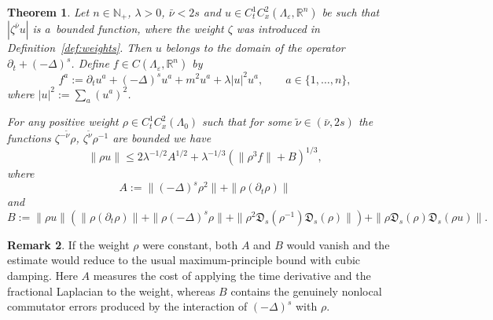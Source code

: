 \documentclass{article}
\numberwithin{equation}{section}
\newcommand{\assign}{:=}
\theoremstyle{plain}
\newtheorem{theorem}{Theorem}[section]
\theoremstyle{definition}
\newtheorem{remark}[theorem]{Remark}
\begin{document}
\begin{theorem}
  \label{thm:partial-coercive-estimates}Let \(n\in\mathbb N_+\), $\lambda > 0$, $\bar{\nu} < 2 s$
  and $u \in C_t^1 C_x^2 (\Lambda_{\varepsilon}, \mathbb{R}^n)$ be such that
  $| \zeta^{\bar{\nu}} u |$ is a~bounded function, where the weight $\zeta$
  was introduced in Definition~\ref{def:weights}. Then $u$ belongs to the domain of
  the operator $\partial_t + (- \Delta)^s$. Define $f \in C 
  (\Lambda_{\varepsilon}, \mathbb{R}^n)$ by
  \begin{equation}
    f^a \assign \partial_t u^a + (- \Delta)^s u^a + m^2 u^a +
    \lambda | u |^2 u^a, \qquad a \in \{ 1, \ldots, n \},
    \label{eq:cubic-fractional}
  \end{equation}
  where $| u |^2  \assign \sum_a (u^a)^2$.
  
  For any positive weight $\rho \in C_t^1 C_x^2
  (\Lambda_{0})$ such that for some $\tilde{\nu} \in
  (\bar{\nu}, 2 s)$ the functions $\zeta^{- \tilde{\nu}} \rho$,
  $\zeta^{\tilde{\nu}} \rho^{- 1}$ are bounded we have
  \begin{equation}
    \| \rho u \| \leqslant 2 \lambda^{- 1 / 2} A^{1 / 2} + \lambda^{- 1 / 3} 
    (\| \rho^3 f \| + B)^{1 / 3}, \label{eq:coercive-bound}
  \end{equation}
  where
  \[ A \assign \| (- \Delta)^s \rho^2 \| + \| \rho (\partial_t \rho) \| \]
  and
  \[ B \assign \| \rho u \|  (\| \rho (\partial_t \rho) \| + \| \rho  (-
     \Delta)^s \rho \| + \| \rho^2 \mathfrak{D}_s (\rho^{- 1}) \mathfrak{D}_s
     (\rho) \|) + \| \rho  \mathfrak{D}_s (\rho) \mathfrak{D}_s (\rho u) \| .
  \]
\end{theorem}

\begin{remark}
If the weight $\rho$ were constant, both $A$ and $B$ would vanish and the
estimate would reduce to the usual maximum-principle bound with cubic damping.
Here $A$ measures the cost of applying the time derivative and the fractional
Laplacian to the weight, whereas $B$ contains the genuinely nonlocal
commutator errors produced by the interaction of $(-\Delta)^s$ with $\rho$.
\end{remark}
\end{document}
